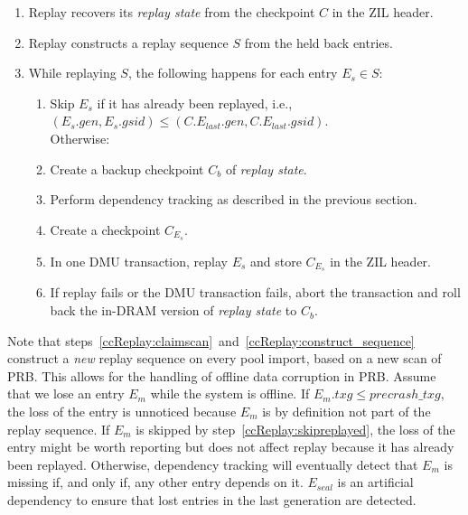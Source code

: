 \documentclass[12pt,a4paper,twoside]{book}
\begin{document}
{\begin{enumerate}[noitemsep,beginpenalty=100000,midpenalty=100000]
\begin{itemize}[noitemsep,beginpenalty=100000,midpenalty=100000]
\begin{itemize}
\begin{enumerate}
                    \item Iterate over $S_{tmp}$ to compute and validate the counters for $E_{1,\dots,n}$.
                        When arriving at $E_{n+1}$, store the expected counter values in $E_{seal}$.
                \end{enumerate}
            \end{itemize}
        \item If the HDL is already in state \textit{replaying}, the ZIL header is not modified.
    \end{itemize}
    \item Replay recovers its \textit{replay state} from the checkpoint $C$ in the ZIL header.
    \item \label{ccReplay:construct_sequence} Replay constructs a replay sequence $S$ from the held back entries.
    \item While replaying $S$, the following happens for each entry $E_s \in S$:
        \begin{enumerate}[noitemsep,beginpenalty=100000,midpenalty=100000]
            \item \label{ccReplay:skipreplayed} Skip $E_s$ if it has already been replayed, i.e., \\
            \mbox{$(E_s.gen, E_s.gsid) \le (C.E_{last}.gen, C.E_{last}.gsid)$}. \\
            Otherwise:
            \item Create a backup checkpoint $C_b$ of \textit{replay state}.
            \item Perform dependency tracking as described in the previous section.
            \item Create a checkpoint $C_{E_s}$.
            \item In one DMU transaction, replay $E_s$ and store $C_{E_s}$ in the ZIL header.
            \item If replay fails or the DMU transaction fails, abort the transaction and roll back the in-DRAM version of \textit{replay state} to $C_b$.
    \end{enumerate}
\end{enumerate}

Note that steps~\ref{ccReplay:claimscan}~and~\ref{ccReplay:construct_sequence} construct a \textit{new} replay sequence on every pool import, based on a new scan of PRB.
This allows for the handling of offline data corruption in PRB.
Assume that we lose an entry $E_m$ while the system is offline.
If \mbox{$E_m.txg \le precrash\_txg$}, the loss of the entry is unnoticed because $E_m$ is by definition not part of the replay sequence.
If $E_m$ is skipped by step~\ref{ccReplay:skipreplayed}, the loss of the entry might be worth reporting but does not affect replay because it has already been replayed.
Otherwise, dependency tracking will eventually detect that $E_m$ is missing if, and only if, any other entry depends on it.
$E_{seal}$ is an artificial dependency to ensure that lost entries in the last generation are detected.

}
\end{document}
